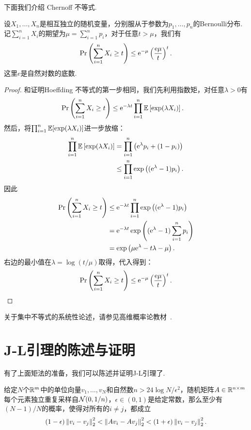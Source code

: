 下面我们介绍 Chernoff 不等式. 
\begin{theorem}\label{thm:chernoff-inequality}
    设$X_1, \dots, X_n$是相互独立的随机变量，分别服从于参数为$p_1, \dots, p_n$的Bernoulli分布.  记$\sum_{i=1}^n X_i$的期望为$\mu = \sum_{i=1}^n p_i$，对于任意$t > \mu$，我们有
    \[
        \Pr\left( \sum_{i=1}^n X_i \geq t\right) \leq \mathrm{e}^{-\mu} \left(\frac{\mathrm{e}\mu}{t}\right)^t.  
    \]
    这里$e$是自然对数的底数.
\end{theorem}

\begin{proof}
和证明Hoeffding 不等式的第一步相同，我们先利用指数矩，对任意$\lambda > 0$有
    \[
    \begin{aligned}
        \Pr\left( \sum_{i=1}^n X_i \geq t\right) &\leq \mathrm{e}^{-\lambda t}\prod_{i=1}^n \mathbb{E}\left[\exp (\lambda X_i)\right].
    \end{aligned}
    \]
然后，将$\prod_{i=1}^n\mathbb{E}[\exp (\lambda X_i)]$进一步放缩：
    \[
    \begin{aligned}
        \prod_{i=1}^n \mathbb{E} \left[\exp (\lambda X_i)\right]&= \prod_{i=1}^n \left(\mathrm{e}^\lambda p_i + (1 - p_i) \right) \\
         &\leq \prod_{i=1}^n \exp\left((\mathrm{e}^\lambda -1)p_i \right). \\
    \end{aligned}
    \]
因此
    \[
    \begin{aligned}
        \Pr\left( \sum_{i=1}^n X_i \geq t\right) &\leq \mathrm{e}^{-\lambda t}\prod_{i=1}^n \exp\left((\mathrm{e}^\lambda -1)p_i \right) \\
        &= \mathrm{e}^{-\lambda t} \exp\left((\mathrm{e}^\lambda -1)\sum_{i=1}^n p_i \right)\\
        &=\exp\left(\mu \mathrm{e}^\lambda -t\lambda-\mu \right).
    \end{aligned}
    \]
右边的最小值在$\lambda = \log (t/\mu)$取得，代入得到：
    \[
    \begin{aligned}
        \Pr\left( \sum_{i=1}^n X_i \geq t\right) \leq \mathrm{e}^{-\mu} \left(\frac{\mathrm{e}\mu}{t}\right)^t.
    \end{aligned}
    \]
\end{proof}

\begin{remark}
    关于集中不等式的系统性论述，请参见高维概率论教材~\cite{vershyninHighDimensionalProbabilityIntroduction2018}.
\end{remark}

\section{J-L引理的陈述与证明}
有了上面矩法的准备，我们可以陈述并证明J-L引理了.
\begin{theorem}\label{thm:johnson-lindenstrauss-lemma}
给定$N$个$\mathbb{R}^m$中的单位向量$v_1,\dots,v_N$和自然数$n >24\log N/\epsilon^2$，随机矩阵$A\in \mathbb{R}^{n\times m}$每个元素独立重复采样自$\mathcal{N}(0,1/n)$，$\epsilon \in (0,1)$是给定常数，那么至少有$(N-1)/N$的概率，使得对所有的$i\neq j$，都成立
    \[
        (1 - \epsilon)\left\|v_i-v_j\right\|_2^2 <\left\|Av_i-Av_j\right\|_2^2 < (1 + \epsilon)\left\|v_i-v_j\right\|_2^2.
    \]
\end{theorem}

